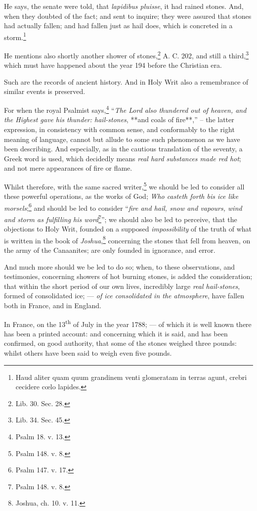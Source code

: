 \documentclass[a4paper, 12pt, oneside]{article}
\begin{document}
He says, the senate were told, that \emph{lapidibus pluisse}, it had rained stones. And, when they doubted of the fact; and sent to inquire; they were assured that stones had actually fallen; and had fallen just as hail does, which is concreted in a storm.\footnote{Haud aliter quam quum grandinem venti glomeratam in terras agunt, crebri cecidere cœlo lapides.}

He mentions also shortly another shower of stones,\footnote{Lib. 30. Sec. 28.} A. C. 202, and still a third,\footnote{Lib. 34. Sec. 45.} which must have happened about the year 194 before the Christian era.

Such are the records of ancient history. And in Holy Writ also a remembrance of similar events is preserved.

For when the royal Psalmist says,\footnote{Psalm 18. v. 13.} ``\emph{The Lord also thundered out of heaven, and the Highest gave his thunder: hail-stones}, **and coals of fire**,'' -- the latter expression, in consistency with common sense, and conformably to the right meaning of language, cannot but allude to some such phenomenon as we have been describing. And especially, as in the cautious translation of the seventy, a Greek word is used, which decidedly means \emph{real hard substances made red hot}; and not mere appearances of fire or flame.

Whilst therefore, with the same sacred writer,\footnote{Psalm 148. v. 8.} we should be led to consider all these powerful operations, as the works of God; \emph{Who casteth forth bis ice like morsels};\footnote{Psalm 147. v. 17.} and should be led to consider ``\emph{fire and hail, snow and vapours, wind and storm as fulfilling his word}\footnote{Psalm 148. v. 8.}''; we should also be led to perceive, that the objections to Holy Writ, founded on a supposed \emph{impossibility} of the truth of what is written in the book of \emph{Joshua},\footnote{Joshua, ch. 10. v. 11.} concerning the stones that fell from heaven, on the army of the Canaanites; are only founded in ignorance, and error.

And much more should we be led to do so; when, to these observations, and testimonies, concerning showers of hot burning stones, is added the consideration; that within the short period of our own lives, incredibly large \emph{real hail-stones}, formed of consolidated ice; --- \emph{of ice consolidated in the atmosphere}, have fallen both in France, and in England.

In France, on the 13\textsuperscript{th} of July in the year 1788; --- of which it is well known there has been a printed account: and concerning which it is said, and has been confirmed, on good authority, that some of the stones weighed three pounds: whilst others have been said to weigh even five pounds.
\end{document}
